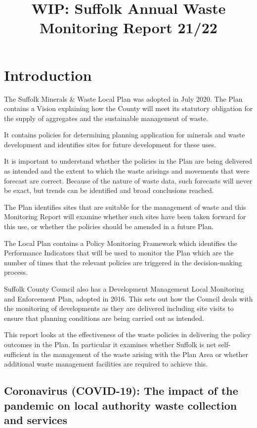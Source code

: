 \documentclass[
]{article}
\title{WIP: Suffolk Annual Waste Monitoring Report 21/22}
\author{}
\date{\vspace{-2.5em}}
\begin{document}
\maketitle

\newpage

\hypertarget{introduction}{%
\section{Introduction}\label{introduction}}

The Suffolk Minerals \& Waste Local Plan was adopted in July 2020. The
Plan contains a Vision explaining how the County will meet its statutory
obligation for the supply of aggregates and the sustainable management
of waste.

It contains policies for determining planning application for minerals
and waste development and identifies sites for future development for
these uses.

It is important to understand whether the policies in the Plan are being
delivered as intended and the extent to which the waste arisings and
movements that were forecast are correct. Because of the nature of waste
data, such forecasts will never be exact, but trends can be identified
and broad conclusions reached.

The Plan identifies sites that are suitable for the management of waste
and this Monitoring Report will examine whether such sites have been
taken forward for this use, or whether the policies should be amended in
a future Plan.

The Local Plan contains a Policy Monitoring Framework which identifies
the Performance Indicators that will be used to monitor the Plan which
are the number of times that the relevant policies are triggered in the
decision-making process.

Suffolk County Council also has a Development Management Local
Monitoring and Enforcement Plan, adopted in 2016. This sets out how the
Council deals with the monitoring of developments as they are delivered
including site visits to ensure that planning conditions are being
carried out as intended.

This report looks at the effectiveness of the waste policies in
delivering the policy outcomes in the Plan. In particular it examines
whether Suffolk is net self-sufficient in the management of the waste
arising with the Plan Area or whether additional waste management
facilities are required to achieve this.

\hypertarget{coronavirus-covid-19-the-impact-of-the-pandemic-on-local-authority-waste-collection-and-services}{%
\subsection{Coronavirus (COVID-19): The impact of the pandemic on local
authority waste collection and
services}\label{coronavirus-covid-19-the-impact-of-the-pandemic-on-local-authority-waste-collection-and-services}}
\end{document}

